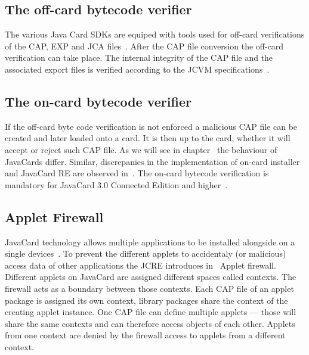 {%

    \subsection{The off-card bytecode verifier}

The various Java Card SDKs are equiped with tools used for off-card verifications of the CAP, EXP and JCA files~\cite{jcoffcardverifier}. After the CAP file conversion the off-card verification can take place. The internal integrity of the CAP file and the associated export files is verified according to the JCVM specifications~\cite{jcspecs31download}.

    \subsection{The on-card bytecode verifier}

    If the off-card byte code verification is not enforced a malicious CAP file can be created and later loaded onto a card. It is then up to the card, whether it will accept or reject such CAP file. As we will see in chapter~\cite{chp:results} the behaviour of JavaCards differ. Similar, discrepanies in the implementation of on-card installer and JavaCard RE are observed in~\cite{lanettrojan}. The on-card bytecode verification is mandatory for JavaCard 3.0 Connected Edition and higher~\cite{barbusecond}. 



    \subsection{Applet Firewall}

    JavaCard technology allows multiple applications to be installed alongside on a single devices~\cite{jcspecs31download}. To prevent the different applets to accidentaly (or malicious) access data of other applications the JCRE introduces in~\cite{jcspecs31download} Applet firewall. Different applets on JavaCard are assigned different spaces called contexts. The firewall acts as a boundary between those contexts. Each CAP file of an applet package is assigned its own context, library packages share the context of the creating applet instance. One CAP file can define multiple applets --- those will share the same contexts and can therefore access objects of each other. Applets from one context are denied by the firewall access to applets from a different context.

}
